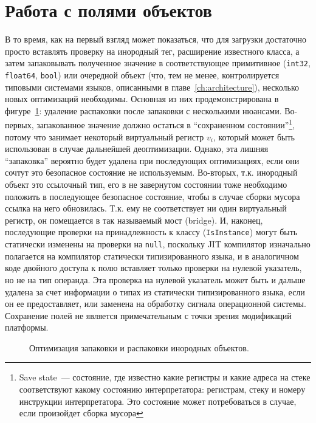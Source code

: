 \documentclass[times,specification,annotation]{itmo-student-thesis}
\begin{document}
\section{Работа с полями объектов}
В то время, как на первый взгляд может показаться, что для загрузки достаточно просто вставлять проверку на инородный тег, расширение известного класса, а затем запаковывать полученное значение в соответствующее примитивное (\texttt{int32}, \texttt{float64}, \texttt{bool}) или очередной объект (что, тем не менее, контролируется типовыми системами языков, описанными в главе~\ref{ch:architecture}), несколько новых оптимизаций необходимы. Основная из них продемонстрирована в фигуре~\ref{fig:field-opt}: удаление распаковки после запаковки с несколькими нюансами. Во-первых, запакованное значение должно остаться в ``сохраненном состоянии''\footnote{Save state~--- состояние, где известно какие регистры и какие адреса на стеке соответствуют какому состоянию интерпретатора: регистрам, стеку и номеру инструкции интерпретатора. Это состояние может потребоваться в случае, если произойдет сборка мусора}, потому что занимает некоторый виртуальный регистр $v_i$, который может быть использован в случае дальнейшей деоптимизации. Однако, эта лишняя ``запаковка'' вероятно будет удалена при последующих оптимизациях, если они сочтут это безопасное состояние не используемым. Во-вторых, т.к. инородный объект это ссылочный тип, его в не завернутом состоянии тоже необходимо положить в последующее безопасное состояние, чтобы в случае сборки мусора ссылка на него обновилась. Т.к. ему не соответствует ни один виртуальный регистр, он помещается в так называемый мост (bridge). И, наконец, последующие проверки на принадлежность к классу (\texttt{IsInstance}) могут быть статически изменены на проверки на \texttt{null}, поскольку JIT компилятор изначально полагается на компилятор статически типизированного языка, и в аналогичном коде двойного доступа к полю вставляет только проверки на нулевой указатель, но не на тип операнда. Эта проверка на нулевой указатель может быть и дальше удалена за счет информации о типах из статически типизированного языка, если он ее предоставляет, или заменена на обработку сигнала операционной системы.\\
Сохранение полей не является примечательным с точки зрения модификаций платформы.

\begin{figure}[H]
	\caption{Оптимизация запаковки и распаковки инородных объектов.}\label{fig:field-opt}
	\centering
	\end{figure}
\end{document}
